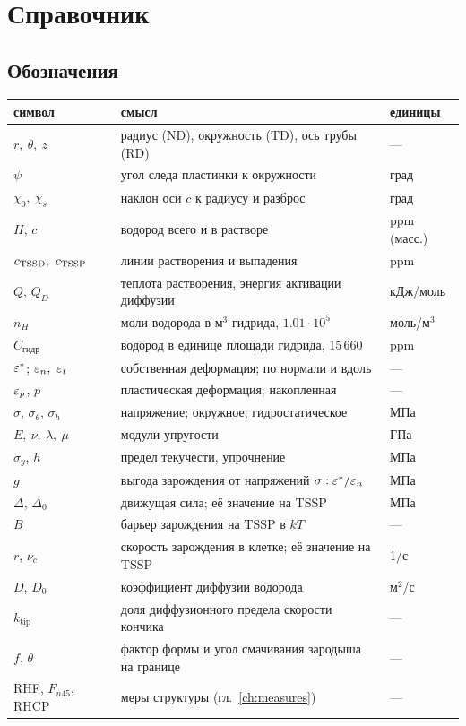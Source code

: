 \chapter{Справочник}\label{app:ref}

\section{Обозначения}

\begin{center}\small
\begin{tabular}{lll}\toprule
символ & смысл & единицы\\\midrule
$r,\ \theta,\ z$ & радиус (ND), окружность (TD), ось трубы (RD) & ---\\
$\psi$ & угол следа пластинки к окружности & град\\
$\chi_0,\ \chi_s$ & наклон оси $c$ к радиусу и разброс & град\\
$H$, $c$ & водород всего и в растворе & ppm (масс.)\\
$c_{\TSSD},\ c_{\TSSP}$ & линии растворения и выпадения & ppm\\
$Q$, $Q_D$ & теплота растворения, энергия активации диффузии & кДж/моль\\
$n_H$ & моли водорода в м$^3$ гидрида, $1.01\cdot10^5$ & моль/м$^3$\\
$C_{\text{гидр}}$ & водород в единице площади гидрида, 15\,660 & ppm\\
$\varepsilon^*$; $\varepsilon_n,\ \varepsilon_t$ & собственная деформация; по нормали и вдоль & ---\\
$\varepsilon_p$, $p$ & пластическая деформация; накопленная & ---\\
$\sigma$, $\sigma_\theta$, $\sigma_h$ & напряжение; окружное; гидростатическое & МПа\\
$E,\ \nu,\ \lambda,\ \mu$ & модули упругости & ГПа\\
$\sigma_y$, $h$ & предел текучести, упрочнение & МПа\\
$g$ & выгода зарождения от напряжений $\sigma:\varepsilon^*/\varepsilon_n$ & МПа\\
$\Delta$, $\Delta_0$ & движущая сила; её значение на TSSP & МПа\\
$B$ & барьер зарождения на TSSP в $kT$ & ---\\
$r$, $\nu_c$ & скорость зарождения в клетке; её значение на TSSP & 1/с\\
$D$, $D_0$ & коэффициент диффузии водорода & м$^2$/с\\
$k_{\text{tip}}$ & доля диффузионного предела скорости кончика & ---\\
$f$, $\theta$ & фактор формы и угол смачивания зародыша на границе & ---\\
RHF, $F_{n45}$, RHCP & меры структуры (гл.~\ref{ch:measures}) & ---\\\bottomrule
\end{tabular}
\end{center}

